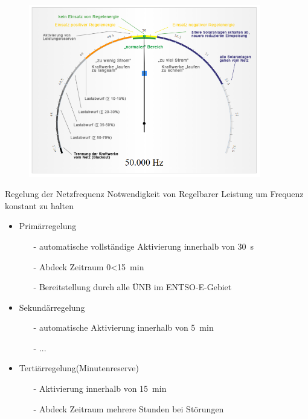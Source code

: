 \documentclass[aspectratio=1610, professionalfonts, 9pt]{beamer}
\begin{document}
{
\begin{frame}
  \begin{figure}
  \includegraphics[width=0.9\textwidth]{images/Frequenz.png}
  \end{figure}
\end{frame}
}

\begin{frame}{Regelung der Netzfrequenz}
Notwendigkeit von Regelbarer Leistung um Frequenz konstant zu halten
\begin{itemize}
\item Primärregelung
  \begin{itemize}
    \item[-] automatische vollständige Aktivierung innerhalb von \SI{30}{\second}
    \item[-] Abdeck Zeitraum \num{0}<\SI{15}{\minute}
    \item[-] Bereitstellung durch alle ÜNB im ENTSO-E-Gebiet
  \end{itemize}
\item Sekundärregelung
\begin{itemize}
\item[-] automatische Aktivierung innerhalb von \SI{5}{\minute}
\item[-] ...
\end{itemize}
\item Tertiärregelung(Minutenreserve)
\begin{itemize}
  \item[-] Aktivierung innerhalb von \SI{15}{\minute}
  \item[-] Abdeck Zeitraum mehrere Stunden bei Störungen
\end{itemize}
\end{itemize}
\end{frame}
\end{document}

